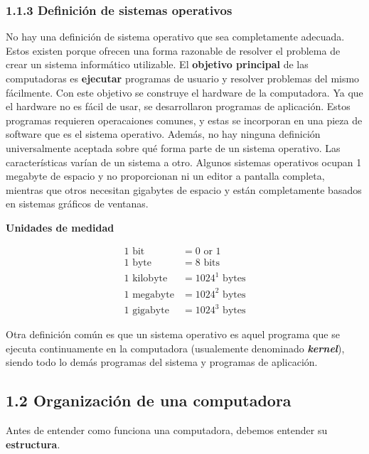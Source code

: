 \documentclass{article}
\begin{document}
\subsubsection*{1.1.3 Definici\'{o}n de sistemas operativos}
No hay una definici\'{o}n de sistema operativo que sea completamente adecuada. Estos existen porque ofrecen una forma
razonable de resolver el problema de crear un sistema inform\'{a}tico utilizable. El \textbf{objetivo principal} de
las computadoras es \textbf{ejecutar} programas de usuario y resolver problemas del mismo f\'{a}cilmente. Con este
objetivo se construye el hardware de la computadora. Ya que el hardware no es f\'{a}cil de usar, se desarrollaron 
programas de aplicaci\'{o}n. Estos programas requieren operacaiones comunes, y estas se incorporan en una pieza de software
que es el sistema operativo.
Adem\'{a}s, no hay ninguna definici\'{o}n universalmente aceptada sobre qu\'{e} forma parte de un sistema operativo. Las
caracter\'{i}sticas var\'{i}an de un sistema a otro. Algunos sistemas operativos ocupan 1 megabyte de espacio y
no proporcionan ni un editor a pantalla completa, mientras que otros necesitan gigabytes de espacio y est\'{a}n
completamente basados en sistemas gr\'{a}ficos de ventanas.
\medbreak

\begin{center}
    \textbf{Unidades de medidad} 
\end{center}
\begin{align*}
    1 \text{ bit} &= 0 \text{ or } 1 \\ 
    1 \text{ byte} &= 8 \text{ bits} \\ 
    1 \text{ kilobyte} &= 1024^1 \text{ bytes} \\ 
    1 \text{ megabyte} &= 1024^2 \text{ bytes} \\ 
    1 \text{ gigabyte} &= 1024^3 \text{ bytes}
\end{align*}

Otra definici\'{o}n com\'{u}n es que un sistema operativo es aquel programa que se ejecuta continuamente en la
computadora (usualemente denominado \textbf{\textit{kernel}}), siendo todo lo dem\'{a}s programas del sistema y
programas de aplicaci\'{o}n.

\subsection*{1.2 Organizaci\'{o}n de una computadora}
Antes de entender como funciona una computadora, debemos entender su \textbf{estructura}.
\end{document}
